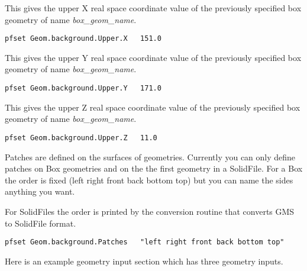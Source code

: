 {This gives the upper X real space coordinate value
of the previously specified box geometry of name {\em box\_geom\_name}.}
\begin{display}\begin{verbatim}
pfset Geom.background.Upper.X   151.0
\end{verbatim}\end{display}

{This gives the upper Y real space coordinate value
of the previously specified box geometry of name {\em box\_geom\_name}.}
\begin{display}\begin{verbatim}
pfset Geom.background.Upper.Y   171.0
\end{verbatim}\end{display}

{This gives the upper Z real space coordinate value
of the previously specified box geometry of name {\em box\_geom\_name}.}
\begin{display}\begin{verbatim}
pfset Geom.background.Upper.Z   11.0
\end{verbatim}\end{display}

{
Patches are defined on the surfaces of geometries.  Currently you can
only define patches on Box geometries and on the the first geometry in a
SolidFile.  For a Box the order is fixed (left right front back bottom
top) but you can name the sides anything you want.

For SolidFiles the order is printed by the conversion routine that
converts GMS to SolidFile format.  
}
\begin{display}\begin{verbatim}
pfset Geom.background.Patches   "left right front back bottom top"
\end{verbatim}\end{display}

Here is an example geometry input section which has three geometry inputs.

